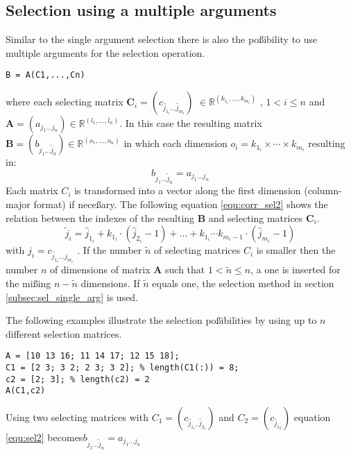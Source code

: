 \subsection{Selection using a multiple arguments}\label{subsec:sel_multiple_arg}
Similar to the single argument selection there is also the po\ss ibility to use multiple arguments for the selection operation.
\begin{lstlisting}[caption={Selecting using multiple arguments}]
B = A(C1,...,Cn) 
\end{lstlisting}
where each selecting matrix $\mathbf{C}_i = (c_{\hat{j}_{1_i}\dots \hat{j}_{m_i}})$ $\in \mathbb{R}^{(k_{1_i}, \dots, k_{m_i})}$ , $1 < i \leq n$ and $\mathbf{A} = (a_{j_1\dots j_n}) \in \mathbb{R}^{(l_1, \dots, l_n)}$. In this case the resulting matrix $\mathbf{B} = (b_{\tilde{j}_1\dots \tilde{j}_n}) \in \mathbb{R}^{(o_1, \dots, o_n)}$ in which each dimension $o_i = k_{1_i} \times \cdots \times k_{m_i}$ resulting in: 
\begin{equation}\label{equ:sel2}
b_{\tilde{j}_1\dots\tilde{j}_n} = a_{j_1\dots j_n} 
\end{equation} 
Each matrix $C_i$ is transformed into a vector along the first dimension (column-major format) if nece\ss ary. The following equation \ref{equ:corr_sel2} shows the relation between the indexes of the resulting $\mathbf{B}$ and selecting matrices $\mathbf{C}_i$.
\begin{equation}\label{equ:corr_sel2}
\tilde{j}_i = \hat{j}_{1_i} + k_{1_i} \cdot (\hat{j}_{2_i}-1) + \dots + k_{1_i} \cdots k_{m_i-1} \cdot (\hat{j}_{m_i}-1)
\end{equation}
with $j_i = c_{\hat{j}_{1_i}\dots \hat{j}_{m_i}}$ .
If the number $\tilde{n}$ of selecting matrices $C_i$ is smaller then the number $n$ of dimensions of matrix $\mathbf{A}$ such that $1 < \tilde{n} \leq n $, a one is inserted for the mi\ss ing $n - \tilde{n}$ dimensions. If $\tilde{n}$ equals one, the selection method in section \ref{subsec:sel_single_arg} is used.

The following examples illustrate the selection po\ss ibilities by using up to $n$ different selection matrices.
\begin{lstlisting}[caption={Example of equation \ref{equ:sel2}}]
A = [10 13 16; 11 14 17; 12 15 18];
C1 = [2 3; 3 2; 2 3; 3 2]; % length(C1(:)) = 8;
c2 = [2; 3]; % length(c2) = 2
A(C1,c2)
\end{lstlisting}

Using two selecting matrices with $C_1 = (c_{\hat{j}_{1_1}, \hat{j}_{2_1}})$ and  $C_2 = (c_{\hat{j}_{1_2}})$ equation \eqref{equ:sel2} becomes$ b_{\tilde{j}_1\dots\tilde{j}_n} = a_{j_1\dots j_n}$

